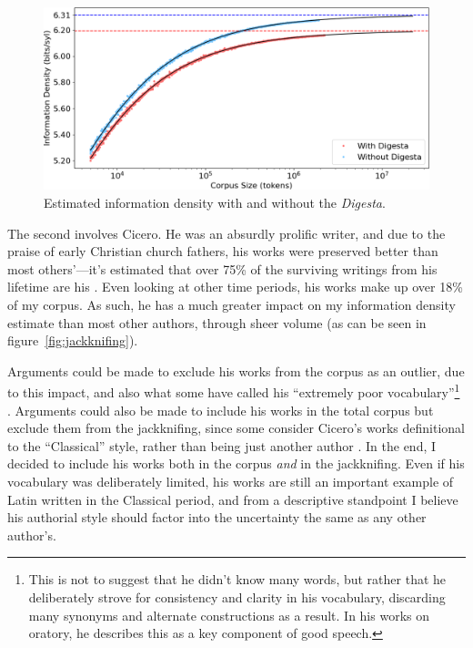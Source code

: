 \documentclass[12pt,twoside]{article}
\begin{document}
\begin{figure}[h]
\centering
\caption{Estimated information density with and without the \emph{Digesta}.}
\label{fig:digesta}
\noindent\includegraphics[width=\linewidth]{digesta}
\end{figure}

The second involves Cicero. He was an absurdly prolific writer, and due to the praise of early Christian church fathers, his works were preserved better than most others'---it's estimated that over 75\% of the surviving writings from his lifetime are his \citep{harrison}. Even looking at other time periods, his works make up over 18\% of my corpus. As such, he has a much greater impact on my information density estimate than most other authors, through sheer volume (as can be seen in figure~\ref{fig:jackknifing}).

Arguments could be made to exclude his works from the corpus as an outlier, due to this impact, and also what some have called his ``extremely poor vocabulary''\footnote{This is not to suggest that he didn't know many words, but rather that he deliberately strove for consistency and clarity in his vocabulary, discarding many synonyms and alternate constructions as a result. In his works on oratory, he describes this as a key component of good speech.} \citep[136]{albrecht}. Arguments could also be made to include his works in the total corpus but exclude them from the jackknifing, since some consider Cicero's works definitional to the ``Classical'' style, rather than being just another author \citep[136]{albrecht}. In the end, I decided to include his works both in the corpus \emph{and} in the jackknifing. Even if his vocabulary was deliberately limited, his works are still an important example of Latin written in the Classical period, and from a descriptive standpoint I believe his authorial style should factor into the uncertainty the same as any other author's.
\end{document}

